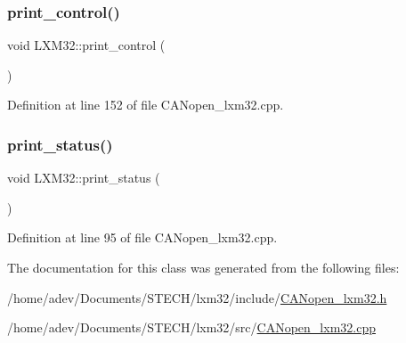 \subsubsection{\texorpdfstring{print\+\_\+control()}{print\_control()}}
{\footnotesize\ttfamily void L\+X\+M32\+::print\+\_\+control (\begin{DoxyParamCaption}{ }\end{DoxyParamCaption})}



Definition at line 152 of file C\+A\+Nopen\+\_\+lxm32.\+cpp.

\mbox{\label{class_c_a_nopen_1_1_l_x_m32_a201d8f9da28994a92612e2618b7a1167}} 
\subsubsection{\texorpdfstring{print\+\_\+status()}{print\_status()}}
{\footnotesize\ttfamily void L\+X\+M32\+::print\+\_\+status (\begin{DoxyParamCaption}{ }\end{DoxyParamCaption})}



Definition at line 95 of file C\+A\+Nopen\+\_\+lxm32.\+cpp.



The documentation for this class was generated from the following files\+:\begin{DoxyCompactItemize}
\item 
/home/adev/\+Documents/\+S\+T\+E\+C\+H/lxm32/include/\hyperlink{_c_a_nopen__lxm32_8h}{C\+A\+Nopen\+\_\+lxm32.\+h}\item 
/home/adev/\+Documents/\+S\+T\+E\+C\+H/lxm32/src/\hyperlink{_c_a_nopen__lxm32_8cpp}{C\+A\+Nopen\+\_\+lxm32.\+cpp}\end{DoxyCompactItemize}

